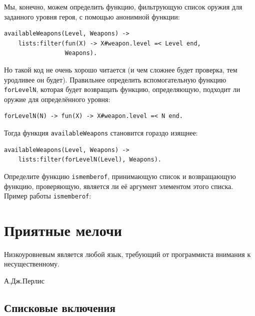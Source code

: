 \documentclass[
  paper=a4,
  fontsize=14pt,
  openany,
  appendixprefix=true
]{scrbook}
\begin{document}
Мы, конечно, можем определить функцию, фильтрующую список оружия для заданного уровня героя, с помощью анонимной функции:

\begin{lstlisting}
availableWeapons(Level, Weapons) ->
    lists:filter(fun(X) -> X#weapon.level =< Level end,
                 Weapons).
\end{lstlisting}

Но такой код не очень хорошо читается (и чем сложнее будет проверка, тем уродливее он будет). Правильнее определить вспомогательную функцию \lstinline{forLevelN}, которая будет возвращать функцию, определяющую, подходит ли оружие для определённого уровня:

\begin{lstlisting}
forLevelN(N) -> fun(X) -> X#weapon.level =< N end.
\end{lstlisting}

Тогда функция \lstinline{availableWeapons} становится гораздо изящнее:

\begin{lstlisting}
availableWeapons(Level, Weapons) ->
    lists:filter(forLevelN(Level), Weapons).
\end{lstlisting}

\begin{problem}\label{ismemberof}
Определите функцию \lstinline{ismemberof}, принимающую список и возвращающую функцию, проверяющую, является ли её аргумент элементом этого списка. Пример работы \lstinline{ismemberof}:


\end{problem}


\chapter{Приятные мелочи}
\label{sugar}

\epigraph{Низкоуровневым является любой язык, требующий от программиста внимания к несущественному.}{А.Дж.Перлис}

\section{Списковые включения}
\end{document}
